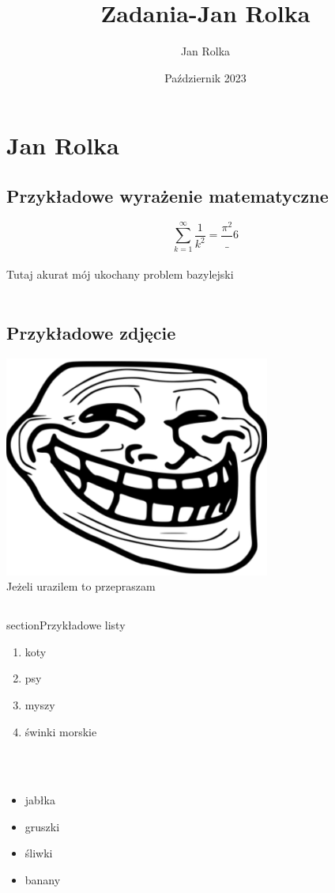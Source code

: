 \documentclass[a4paper]{article}
\title{Zadania-Jan Rolka}
\author{Jan Rolka}
\date{Październik 2023}
\begin{document}
\section{Jan Rolka}
\label{sec:Jan Rolka}

\subsection{Przykładowe wyrażenie matematyczne}

$$
\sum_{k=1}^{\infty}\frac{1}{k^2} = \frac{\pi^2}_{6}   
$$ \\

Tutaj akurat mój ukochany problem bazylejski
\\\\

\subsection{Przykładowe zdjęcie}

\includegraphics[scale=0.25]{pictures/ObrazkiJR/Trollface}\\

Jeżeli urazilem to przepraszam

\subsection{}section{Przykładowe listy}

\begin{enumerate}
    \item koty
    \item psy
    \item myszy
    \item świnki morskie
\end{enumerate}
\\\\
\begin{itemize}
    \item jabłka
    \item gruszki
    \item śliwki
    \item banany
\end{itemize}
\end{document}
